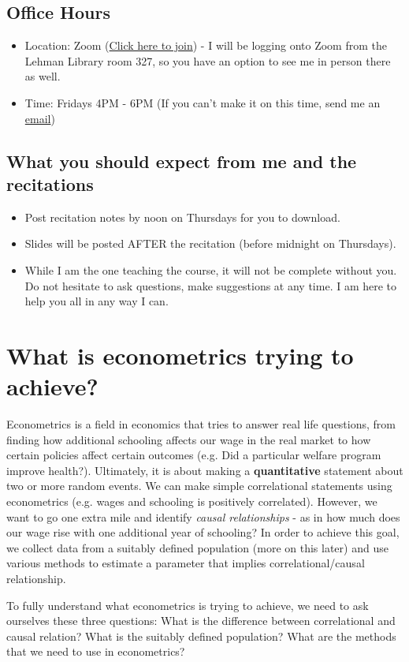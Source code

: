 \documentclass[12pt]{article}
\theoremstyle{definition}
\theoremstyle{property}
\theoremstyle{assumption}
\theoremstyle{example}
\theoremstyle{comment}
\begin{document}
\subsection{Office Hours}
\begin{itemize}
\item Location: Zoom (\href{https://columbiauniversity.zoom.us/j/96949225512?pwd=bTgwKytIVHpmNVloU0hNOEFxQ3J3UT09}{Click here to join}) - I will be logging onto Zoom from the Lehman Library room 327, so you have an option to see me in person there as well.
\item Time: Fridays 4PM - 6PM (If you can't make it on this time, send me an \href{mailto:sl4436@columbia.edu}{email})
\end{itemize}
\subsection{What you should expect from me and the recitations}
\begin{itemize}
\item Post recitation notes by noon on Thursdays for you to download.
\item Slides will be posted AFTER the recitation (before midnight on Thursdays).

\item While I am the one teaching the course, it will not be complete without you. Do not hesitate to ask questions, make suggestions at any time. I am here to help you all in any way I can. 
\end{itemize}


\section{What is econometrics trying to achieve?}
Econometrics is a field in economics that tries to answer real life questions, from finding how additional schooling affects our wage in the real market to how certain policies affect certain outcomes (e.g. Did a particular welfare program improve health?). Ultimately, it is about making a \textbf{quantitative} statement about two or more random events.  We can make simple correlational statements using econometrics (e.g. wages and schooling is positively correlated). However, we want to go one extra mile and identify \textit{causal relationships} - as in how much does our wage rise with one additional year of schooling? In order to achieve this goal, we collect data from a suitably defined population (more on this later) and use various methods to estimate a parameter that implies correlational/causal relationship. \par
To fully understand what econometrics is trying to achieve, we need to ask ourselves these three questions: What is the difference between correlational and causal relation? What is the suitably defined population? What are the methods that we need to use in econometrics?
\end{document}
